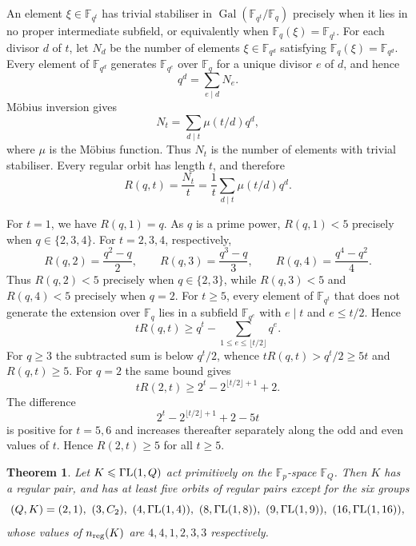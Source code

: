 \documentclass[10pt]{amsart}
\newtheorem{theorem}{Theorem}[section]
\theoremstyle{definition}
\renewcommand{\le}{\leqslant}
\renewcommand{\ge}{\geqslant}
\let\oldendproof\endproof
\renewenvironment{proof}[1][\proofname]{%
  \oldproof[\bfseries #1]%
}{\oldendproof}
\newcommand{\GammaL}{\Gamma{\rm L}}
\DeclareMathOperator{\Gal}{Gal}
\numberwithin{equation}{section}
\numberwithin{table}{section}
\begin{document}
\begin{proof}
An element $\xi\in\mathbb{F}_{q^t}$ has trivial stabiliser in
$\Gal(\mathbb{F}_{q^t}/\mathbb{F}_q)$ precisely when it lies in no proper
intermediate subfield, or equivalently when
$\mathbb{F}_q(\xi)=\mathbb{F}_{q^t}$.
For each divisor $d$ of $t$, let $N_d$ be the number of elements
$\xi\in\mathbb{F}_{q^d}$ satisfying
$\mathbb{F}_q(\xi)=\mathbb{F}_{q^d}$. Every element of
$\mathbb{F}_{q^d}$ generates $\mathbb{F}_{q^e}$ over $\mathbb{F}_q$ for a
unique divisor $e$ of $d$, and hence
$$
  q^d=\sum_{e\mid d}N_e.
$$
M\"obius inversion gives
$$
  N_t=\sum_{d\mid t}\mu(t/d)q^d,
$$
where $\mu$ is the M\"obius function. Thus $N_t$ is the number of elements
with trivial stabiliser. Every regular orbit has length $t$, and therefore
$$
  R(q,t)=\frac{N_t}{t}
        =\frac1t\sum_{d\mid t}\mu(t/d)q^d.
$$

For $t=1$, we have $R(q,1)=q$. As $q$ is a prime power,
$R(q,1)<5$ precisely when $q\in\{2,3,4\}$. For $t=2,3,4$,
respectively,
$$
R(q,2)=\frac{q^2-q}{2},\qquad
R(q,3)=\frac{q^3-q}{3},\qquad
R(q,4)=\frac{q^4-q^2}{4}.
$$
Thus $R(q,2)<5$ precisely when $q\in\{2,3\}$, while
$R(q,3)<5$ and $R(q,4)<5$ precisely when $q=2$. For $t\ge5$, every element of
$\mathbb{F}_{q^t}$ that does not generate the extension over $\mathbb{F}_q$
lies in a subfield $\mathbb{F}_{q^{e}}$ with $e\mid t$ and $e\le t/2$. Hence
 $$
 tR(q,t)\ge q^{t}-\sum_{1\le e\le\lfloor t/2\rfloor}q^{e}.
 $$
 For $q\ge3$ the subtracted sum is below $q^{t}/2$, whence $tR(q,t)>q^{t}/2\ge5t$ and
$R(q,t)\ge5$. For $q=2$ the same bound gives
$$
 tR(2,t)\ge2^{t}-2^{\lfloor t/2\rfloor+1}+2.
$$
The difference
$$
 2^{t}-2^{\lfloor t/2\rfloor+1}+2-5t
$$
is positive for $t=5,6$ and increases thereafter separately along the odd and
even values of $t$. Hence $R(2,t)\ge5$ for all $t\ge5$.
\end{proof}

\begin{theorem}\label{thm:semilinear}
Let $K\le\GammaL(1,Q)$ act primitively on the
$\mathbb{F}_p$-space $\mathbb{F}_Q$. Then
$K$ has a
regular pair, and has at least five orbits of regular pairs except for the six groups
$$
  (Q,K)=(2,1),\ (3,C_2),\ (4,\GammaL(1,4)),\ (8,\GammaL(1,8)),\
  (9,\GammaL(1,9)),\ (16,\GammaL(1,16)),
$$
whose values of $n_{\rm reg}(K)$ are $4,4,1,2,3,3$ respectively.
\end{theorem}
\end{document}
